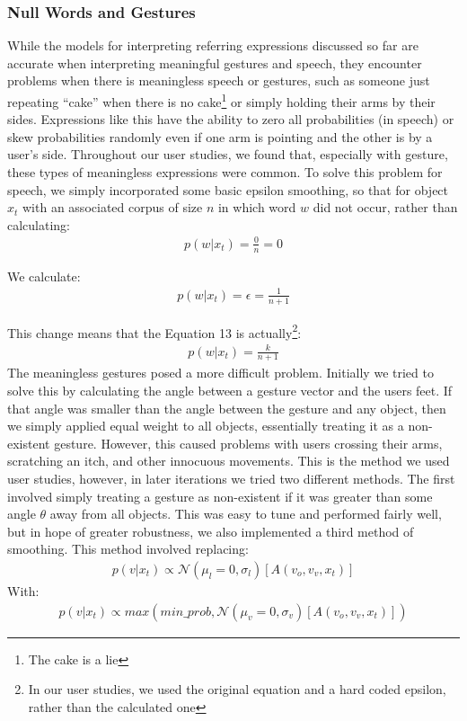 \documentclass[a4paper, 11pt]{article} %
\begin{document}
\subsubsection{Null Words and Gestures}
While the models for interpreting referring expressions discussed so far are accurate when interpreting meaningful gestures and speech, they encounter problems when there is meaningless speech or gestures, such as someone just repeating ``cake'' when there is no cake\footnote{The cake is a lie} or simply holding their arms by their sides. Expressions like this have the ability to zero all probabilities (in speech) or skew probabilities randomly even if one arm is pointing and the other is by a user's side. Throughout our user studies, we found that, especially with gesture, these types of meaningless expressions were common. To solve this problem for speech, we simply incorporated some basic epsilon smoothing, so that for object $x_t$ with an associated corpus of size $n$ in which word $w$ did not occur, rather than calculating:
\begin{align}
p(w | x_t) = \frac{0}{n} = 0
\end{align}

We calculate:
\begin{align}
p(w | x_t) = \epsilon = \frac{1}{n+1}
\end{align}

This change means that the Equation 13 is actually\footnote{In our user studies, we used the original equation and a hard coded epsilon, rather than the calculated one}:
\begin{align}
p(w | x_t) = \frac{k}{n+1}
\end{align}
The meaningless gestures posed a more difficult problem. Initially we tried to solve this by calculating the angle between a gesture vector and the users feet. If that angle was smaller than the angle between the gesture and any object, then we simply applied equal weight to all objects, essentially treating it as a non-existent gesture. However, this caused problems with users crossing their arms, scratching an itch, and other innocuous movements. This is the method we used user studies, however, in later iterations we tried two different methods. The first involved simply treating a gesture as non-existent if it was greater than some angle $\theta$ away from all objects. This was easy to tune and performed fairly well, but in hope of greater robustness, we also implemented a third method of smoothing. This method involved replacing:
\begin{align}
p(v | x_t) \propto \mathcal{N}(\mu_l=0, \sigma_l)[A(v_o, v_v, x_t)]
\end{align}
With:
\begin{align}
p(v | x_t) \propto max(min\_prob, \mathcal{N}(\mu_v=0, \sigma_v)[A(v_o, v_v, x_t)])
\end{align}
\end{document}
